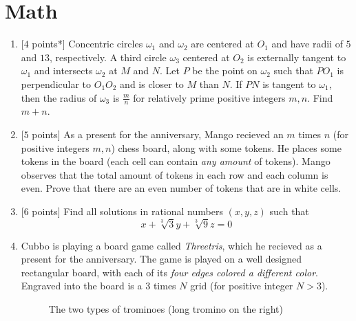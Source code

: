 \section*{\textsf{\textbf{\textcolor{meablue}{Math}}}}
\begin{enumerate}[align=left,start=1,label=\textbf{\textcolor{meablue}{Problem \arabic*}}]
    \item {[$4$ points*]} Concentric circles $\omega_1$ and $\omega_2$ are centered at $O_1$ and have radii of $5$ and $13$, respectively. A third circle $\omega_3$ centered at $O_2$ is externally tangent to $\omega_1$ and intersects $\omega_2$ at $M$ and $N$. Let $P$ be the point on $\omega_2$ such that $PO_1$ is perpendicular to $O_1 O_2$ and is closer to $M$ than $N$. If $PN$ is tangent to $\omega_1$, then the radius of $\omega_3$ is $\frac{m}{n}$ for relatively prime positive integers $m, n$. Find $m + n$.
    \item {[$5$ points]}
        As a present for the anniversary, Mango recieved an $m$ times $n$ (for positive integers $m, n$) chess board, along with some tokens. He places some tokens in the board (each cell can contain \emph{any amount} of tokens). Mango observes that the total amount of tokens in each row and each column is even. Prove that there are an even number of tokens that are in white cells.
    \item {[$6$ points]} Find all solutions in rational numbers $(x, y, z)$ such that
        \[x + \sqrt[3]{3}y + \sqrt[3]{9}z = 0\]
    \item 
        Cubbo is playing a board game called \emph{Threetris}, which he recieved as a present for the anniversary. The game is played on a well designed rectangular board, with each of its \emph{four edges colored a different color}. Engraved into the board is a 3 times $N$ grid (for positive integer $N > 3$).
        \begin{figure}[!ht]
            \centering
            \caption{The two types of trominoes (long tromino on the right)}
        \end{figure}
        

\end{enumerate}
